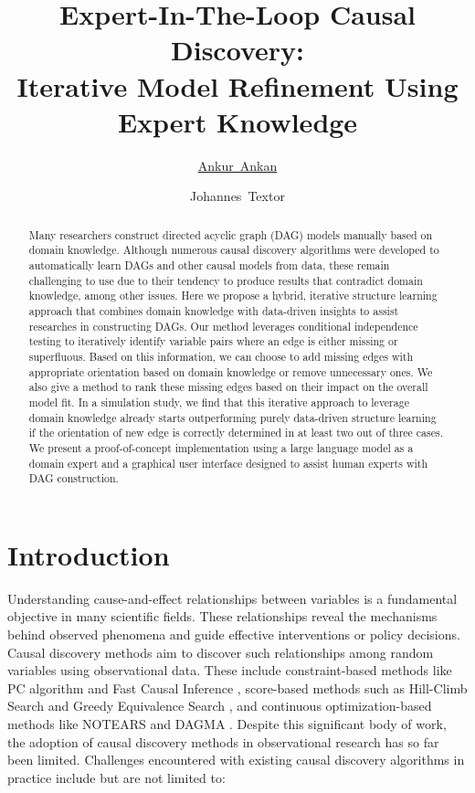 \documentclass[accepted]{uai2025} %
\title{Expert-In-The-Loop Causal Discovery: \\ Iterative Model Refinement Using Expert Knowledge}
\author[1]{\href{mailto:<ankur.ankan@ru.nl>?Subject=Your UAI 2025 paper}{Ankur~Ankan}{}}
\author[1]{Johannes~Textor}
\affil[1]{%
    Institute for Computing and Information Sciences\\
    Radboud University\\
    Nijmegen, The Netherlands
}
\begin{document}
\maketitle

\begin{abstract}
	Many researchers construct directed acyclic graph (DAG) models manually
	based on domain knowledge. 
	Although numerous causal discovery algorithms were developed to automatically learn
	DAGs and other causal models from data, these remain challenging to 
	use due to their tendency to produce results that contradict
	domain knowledge, among other issues. Here we propose a hybrid, 
	iterative structure learning approach that combines domain knowledge with
	data-driven insights to assist researches in constructing DAGs.
	Our method leverages conditional independence
	testing to iteratively identify variable pairs where an edge is
	either missing or superfluous. Based on this information, we can choose
	to add missing edges with appropriate orientation based on domain
	knowledge or remove unnecessary ones. We also give a method to rank
	these missing edges based on their impact on the overall model fit.
	In a simulation study, we find that this iterative approach to leverage domain 
	knowledge already starts outperforming purely data-driven structure learning if 
	the orientation of new edge is correctly determined in at least two out of three cases.
	We present a proof-of-concept implementation using a large language 
	model as a domain expert and a graphical user interface designed to 
	assist human experts with DAG construction.
\end{abstract}

\section{Introduction}
Understanding cause-and-effect relationships between variables is a fundamental
objective in many scientific fields. These relationships reveal the mechanisms
behind observed phenomena and guide effective interventions or policy
decisions. Causal discovery methods aim to discover such relationships among
random variables using observational data. These
include constraint-based methods like PC algorithm \citep{Spirtes2001,KalischB07} 
and Fast Causal Inference \citep{Spirtes2000}, score-based methods such as Hill-Climb
Search and Greedy Equivalence Search \citep{Chickering2002}, and continuous
optimization-based methods like NOTEARS \citep{Zheng2018} and DAGMA
\citep{Bello2022}. Despite this significant body of work,
the adoption of causal discovery methods in observational research has so far 
been limited. Challenges encountered with existing
causal discovery algorithms in practice include but are not limited to:
\end{document}
